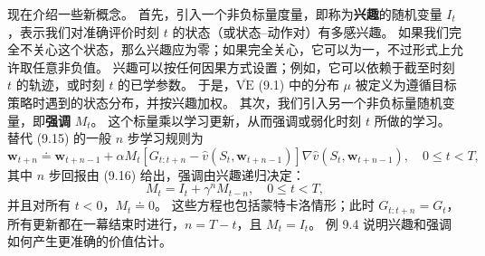 \documentclass[UTF8, 12pt, fontset=fandol, oneside]{ctexart}
\begin{document}
现在介绍一些新概念。
首先，引入一个非负标量度量，即称为\textbf{兴趣}的随机变量 $I_t$，表示我们对准确评价时刻 $t$ 的状态（或状态--动作对）有多感兴趣。
如果我们完全不关心这个状态，那么兴趣应为零；如果完全关心，它可以为一，不过形式上允许取任意非负值。
兴趣可以按任何因果方式设置；例如，它可以依赖于截至时刻 $t$ 的轨迹，或时刻 $t$ 的已学参数。
于是，$\overline{\mathrm{VE}}$ (9.1) 中的分布 $\mu$ 被定义为遵循目标策略时遇到的状态分布，并按兴趣加权。
其次，我们引入另一个非负标量随机变量，即\textbf{强调} $M_t$。
这个标量乘以学习更新，从而强调或弱化时刻 $t$ 所做的学习。
替代 (9.15) 的一般 $n$ 步学习规则为
\begin{equation}
\mathbf{w}_{t+n}\doteq
\mathbf{w}_{t+n-1}
+\alpha M_t\left[G_{t:t+n}-\hat{v}(S_t,\mathbf{w}_{t+n-1})\right]\nabla\hat{v}(S_t,\mathbf{w}_{t+n-1}),
\quad 0\le t<T,
\tag{9.25}
\end{equation}
其中 $n$ 步回报由 (9.16) 给出，强调由兴趣递归决定：
\begin{equation}
M_t=I_t+\gamma^n M_{t-n},
\quad 0\le t<T,
\tag{9.26}
\end{equation}
并且对所有 $t<0$，$M_t\doteq 0$。
这些方程也包括蒙特卡洛情形；此时 $G_{t:t+n}=G_t$，所有更新都在一幕结束时进行，$n=T-t$，且 $M_t=I_t$。
例 9.4 说明兴趣和强调如何产生更准确的价值估计。
\end{document}
